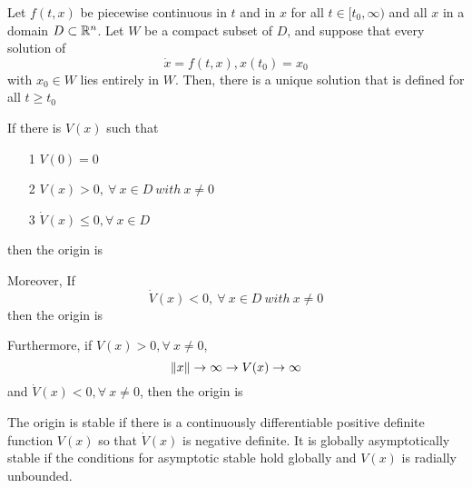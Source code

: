     \begin{lemma}[lemma 1.3]
        Let $f(t,x)$ be piecewise continuous in $t$ and 
         in $x$ for all $t\in [t_0,\infty)$
        and all $x$ in a domain $D\subset \mathbb{R}^n$.
        Let $W$ be a compact subset of $D$, 
        and suppose that every solution of 
        \[\dot{x}=f(t,x), x(t_0)=x_0\]
        with $x_0\in W$ lies entirely in $W$. 
        Then, there is a unique solution that is defined for all $t\ge t_0$
    \end{lemma}

    \begin{theorem}
        If there is $V(x)$ such that 
            \begin{itemize}
                \item[1] $V(0)=0$
                \item[2] $V(x)>0, \ \forall \ x \in D \ with\ x\neq 0$
                \item[3] $\dot{V}(x) \le 0, \forall\ x\in D$
            \end{itemize}
            then the origin is 

        Moreover, If 
        \[\dot{V}(x)<0,\ \forall \ x\in D \ with\ x\neq 0\]
        then the origin is 

        Furthermore, if $V(x)>0, \forall \ x\neq 0$,
        \[\left\lVert x\right\rVert\to \infty \rightarrow V(x) \to \infty\]
        and $\dot{V}(x)<0,\forall\ x\neq 0$, then the origin is 
    \end{theorem} 

    \begin{theorem}
        The origin is stable if there is a continuously differentiable positive definite function $V(x)$ so that $\dot{V}(x)$ is negative definite. 
        It is globally asymptotically stable if the conditions for asymptotic stable hold globally and ${V}(x)$ is radially unbounded.
    \end{theorem}